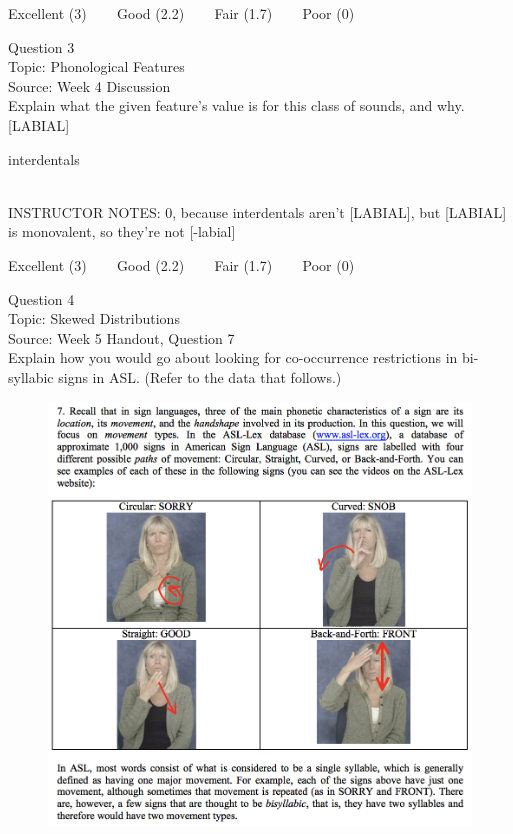 \documentclass[12pt]{article}
\begin{document}
\vfill
Excellent (3) ~~~ Good (2.2) ~~~ Fair (1.7) ~~~ Poor (0)
\newpage

{\large Question 3}\\

Topic: Phonological Features\\
Source: Week 4 Discussion\\

Explain what the given feature’s value is for this class of sounds, and why.\\

{[LABIAL]}

interdentals


~\\
INSTRUCTOR NOTES: 0, because interdentals aren't [LABIAL], but [LABIAL] is monovalent, so they're not [-labial]


\vfill
Excellent (3) ~~~ Good (2.2) ~~~ Fair (1.7) ~~~ Poor (0)
\newpage

{\large Question 4}\\

Topic: Skewed Distributions\\
Source: Week 5 Handout, Question 7\\

Explain how you would go about looking for co-occurrence restrictions in bi-syllabic signs in ASL. (Refer to the data that follows.)\\

\begin{figure}[H]
\includegraphics{../images/ASL_movement.png}
\end{figure}
\end{document}
